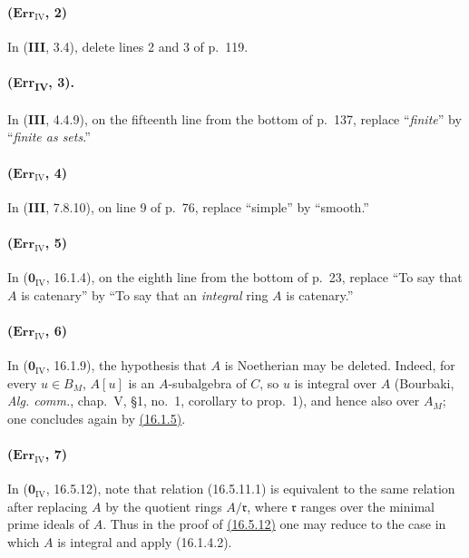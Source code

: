 \paragraph{($\mathbf{Err}_{\mathrm{IV}}$, 2)}
In (\textbf{III}, 3.4), delete lines 2 and 3 of p.~119.

\paragraph{(Err\textsubscript{IV}, 3).}
In (\textbf{III}, 4.4.9), on the fifteenth line from the bottom of p.~137,
replace ``\emph{finite}'' by ``\emph{finite as sets}.''

\paragraph{($\mathbf{Err}_{\mathrm{IV}}$, 4)}
In (\textbf{III}, 7.8.10), on line 9 of p.~76, replace ``simple'' by ``smooth.''

\paragraph{($\mathbf{Err}_{\mathrm{IV}}$, 5)}
In ($\mathbf{0}_{\mathrm{IV}}$, 16.1.4), on the eighth line from the bottom of
p.~23, replace ``To say that $A$ is catenary'' by ``To say that an
\emph{integral} ring $A$ is catenary.''

\paragraph{($\mathbf{Err}_{\mathrm{IV}}$, 6)}
In ($\mathbf{0}_{\mathrm{IV}}$, 16.1.9), the hypothesis that $A$ is Noetherian
may be deleted.  Indeed, for every $u\in B_M$, $A[u]$ is an
$A$-subalgebra of $C$, so $u$ is integral over $A$ (Bourbaki,
\emph{Alg. comm.}, chap.~V, \S1, no.~1, corollary to prop.~1), and
hence also over $A_M$; one concludes again by {\hyperref[section:IV.16]{(16.1.5)}}.

\paragraph{($\mathbf{Err}_{\mathrm{IV}}$, 7)}
In ($\mathbf{0}_{\mathrm{IV}}$, 16.5.12), note that relation (16.5.11.1) is
equivalent to the same relation after replacing $A$ by the quotient rings
$A/\mathfrak r$, where $\mathfrak r$ ranges over the minimal prime ideals
of $A$.  Thus in the proof of {\hyperref[section:IV.16]{(16.5.12)}} one may reduce to the case in
which $A$ is integral and apply (16.1.4.2).

